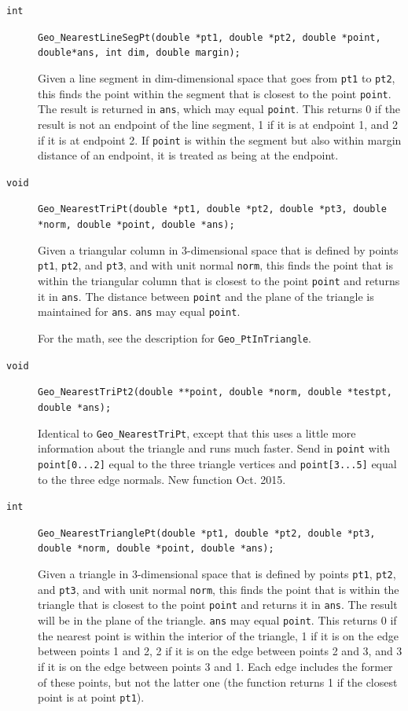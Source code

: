 \documentclass[11pt]{article}
\newcommand {\ttt} {\texttt}
\begin{document}
\begin{description}
\item[\ttt{int}]
\ttt{Geo\_NearestLineSegPt(double *pt1, double *pt2, double *point, double*ans, int dim, double margin);}

Given a line segment in dim-dimensional space that goes from \ttt{pt1} to \ttt{pt2}, this finds the point within the segment that is closest to the point \ttt{point}. The result is returned in \ttt{ans}, which may equal \ttt{point}. This returns 0 if the result is not an endpoint of the line segment, 1 if it is at endpoint 1, and 2 if it is at endpoint 2. If \ttt{point} is within the segment but also within margin distance of an endpoint, it is treated as being at the endpoint.

\item[\ttt{void}]
\ttt{Geo\_NearestTriPt(double *pt1, double *pt2, double *pt3, double *norm, double *point, double *ans);}

Given a triangular column in 3-dimensional space that is defined by points \ttt{pt1}, \ttt{pt2}, and \ttt{pt3}, and with unit normal \ttt{norm}, this finds the point that is within the triangular column that is closest to the point \ttt{point} and returns it in \ttt{ans}. The distance between \ttt{point} and the plane of the triangle is maintained for \ttt{ans}. \ttt{ans} may equal \ttt{point}.

For the math, see the description for \ttt{Geo\_PtInTriangle}.

\item[\ttt{void}]
\ttt{Geo\_NearestTriPt2(double **point, double *norm, double *testpt, double *ans);}

Identical to \ttt{Geo\_NearestTriPt}, except that this uses a little more information about the triangle and runs much faster. Send in \ttt{point} with \ttt{point[0...2]} equal to the three triangle vertices and \ttt{point[3...5]} equal to the three edge normals. New function Oct. 2015.

\item[\ttt{int}]
\ttt{Geo\_NearestTrianglePt(double *pt1, double *pt2, double *pt3, double *norm, double *point, double *ans);}

Given a triangle in 3-dimensional space that is defined by points \ttt{pt1}, \ttt{pt2}, and \ttt{pt3}, and with unit normal \ttt{norm}, this finds the point that is within the triangle that is closest to the point \ttt{point} and returns it in \ttt{ans}. The result will be in the plane of the triangle. \ttt{ans} may equal \ttt{point}. This returns 0 if the nearest point is within the interior of the triangle, 1 if it is on the edge between points 1 and 2, 2 if it is on the edge between points 2 and 3, and 3 if it is on the edge between points 3 and 1. Each edge includes the former of these points, but not the latter one (the function returns 1 if the closest point is at point \ttt{pt1}).


\end{description}
\end{document}
